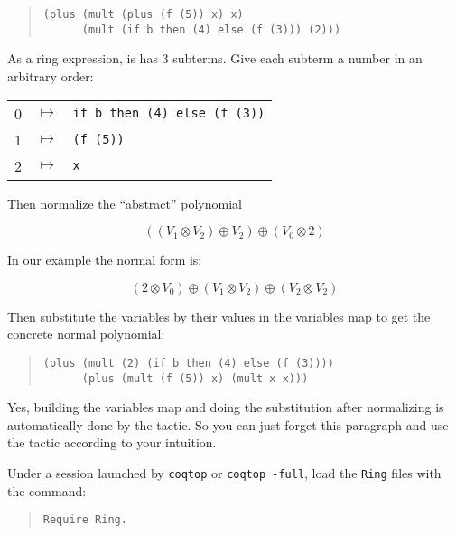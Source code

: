 \begin{quotation}
\begin{verbatim}
(plus (mult (plus (f (5)) x) x)
      (mult (if b then (4) else (f (3))) (2)))
\end{verbatim}
\end{quotation}

\noindent As a ring expression, is has 3 subterms. Give each subterm a
number in an arbitrary order:

\begin{tabular}{ccl}
0 & $\mapsto$ & \verb|if b then (4) else (f (3))| \\
1 & $\mapsto$ & \verb|(f (5))| \\
2 & $\mapsto$ & \verb|x| \\
\end{tabular}

\noindent Then normalize the ``abstract'' polynomial 

$$((V_1 \otimes V_2) \oplus V_2) \oplus (V_0 \otimes 2) $$

\noindent In our example the normal form is:

$$(2 \otimes V_0) \oplus (V_1 \otimes V_2) \oplus (V_2 \otimes V_2)$$

\noindent Then substitute the variables by their values in the variables map to
get the concrete normal polynomial:

\begin{quotation}
\begin{verbatim}
(plus (mult (2) (if b then (4) else (f (3)))) 
      (plus (mult (f (5)) x) (mult x x))) 
\end{verbatim}
\end{quotation}


Yes, building the variables map and doing the substitution after
normalizing is automatically done by the tactic. So you can just forget
this paragraph and use the tactic according to your intuition.


Under a session launched by \texttt{coqtop} or \texttt{coqtop -full},
load the \texttt{Ring} files with the command:

\begin{quotation}
\begin{verbatim}
Require Ring.
\end{verbatim}
\end{quotation}

